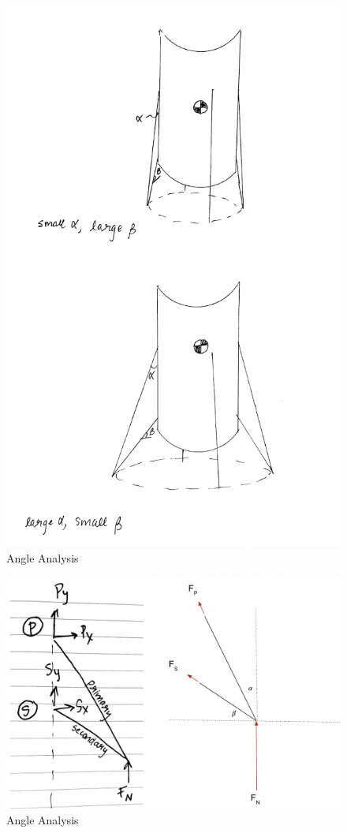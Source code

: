 \begin{figure}[H]
\centering
\includegraphics[scale=0.3]{src/figs/footprint.png}
\caption{Angle Analysis}
\label{figs:fp}
\end{figure}

\begin{figure}[H]
\centering
\includegraphics[scale=0.3]{src/figs/angleanalysis.png}
\caption{Angle Analysis}
\label{figs:aa}
\end{figure}

